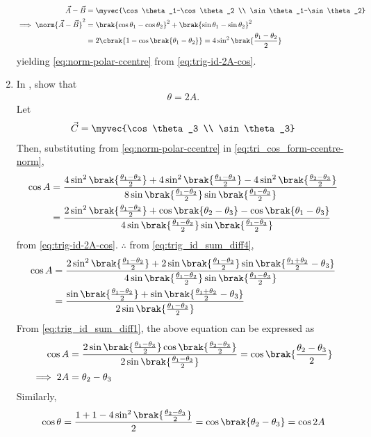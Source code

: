 \begin{enumerate}[label=\thesection.\arabic*.,ref=\thesection.\theenumi]
\begin{align}
	  \vec{A}-\vec{B} &= 
\myvec{\cos \theta_1-\cos \theta_2 \\ \sin \theta_1-\sin \theta_2}
\\
\implies 
	  \norm{\vec{A}-\vec{B}}^2 &= 
	  \brak{\cos \theta_1-\cos \theta_2}^2 +\brak{\sin \theta_1-\sin \theta_2}^2
	  \\
	  &= 2\cbrak{1-
	  \cos \brak{\theta_1-\theta_2}} = 4 \sin^2 \brak{\frac{\theta_1-\theta_2}{2}}
  \end{align}
  yielding 
\eqref{eq:norm-polar-ccentre} from
\eqref{eq:trig-id-2A-cos}.
  \item In 
	,
show that 
  \begin{align}
	  \theta = 2A
\label{eq:ang-subtend-ccentre}.
  \end{align}
  \solution Let 
  \begin{align}
	  \vec{C} = \myvec{\cos \theta_3 \\ \sin \theta_3}
  \end{align}
  Then, 
  substituting 
  from 
\eqref{eq:norm-polar-ccentre}
in 
\eqref{eq:tri_cos_form-ccentre-norm},
  \begin{align}
	  \cos A &= \frac{4 \sin^2 \brak{\frac{\theta_1-\theta_2}{2}} +4\sin^2 \brak{\frac{\theta_1-\theta_3}{2}}-4 \sin^2 \brak{\frac{\theta_2-\theta_3}{2}}}{8 \sin \brak{\frac{\theta_1-\theta_2}{2}} \sin \brak{\frac{\theta_1-\theta_3}{2}}}
	  \\
	   &= \frac{2 \sin^2 \brak{\frac{\theta_1-\theta_2}{2}} +\cos \brak{{\theta_2-\theta_3}}- \cos \brak{{\theta_1-\theta_3}}}{4 \sin \brak{\frac{\theta_1-\theta_2}{2}} \sin \brak{\frac{\theta_1-\theta_3}{2}}}
  \end{align}
  from 
\eqref{eq:trig-id-2A-cos}. $\therefore$ from 
\eqref{eq:trig_id_sum_diff4},
  \begin{align}
	   \cos A &= \frac{2 \sin^2 \brak{\frac{\theta_1-\theta_2}{2}} +2\sin \brak{\frac{\theta_1-\theta_2}{2}}\sin \brak{\frac{\theta_1+\theta_2}{2}-\theta_3}}{4 \sin \brak{\frac{\theta_1-\theta_2}{2}} \sin \brak{\frac{\theta_1-\theta_3}{2}}}
	  \\
	   &= \frac{ \sin \brak{\frac{\theta_1-\theta_2}{2}} +\sin \brak{\frac{\theta_1+\theta_2}{2}-\theta_3}}{ 2\sin\brak{\frac{\theta_1-\theta_3}{2}}}
  \end{align}
  From 
\eqref{eq:trig_id_sum_diff1}, the above equation can be expressed as
  \begin{align}
\cos A	   &= \frac{ 2\sin \brak{\frac{\theta_1-\theta_3}{2}} \cos\brak{\frac{\theta_2-\theta_3}{2}}}{ 2\sin\brak{\frac{\theta_1-\theta_3}{2}}} = \cos\brak{\frac{\theta_2-\theta_3}{2}}
\label{eq:tri_ccentre_subtend-temp}
	   \\
	   \implies 2A &= \theta_2-\theta_3
\label{eq:tri_ccentre_subtend}
  \end{align}
  Similarly, 
  \begin{align}
	  \cos \theta = \frac{1 + 1 - 4\sin^2\brak{\frac{\theta_2-\theta_3}{2}}}{2} = \cos\brak{{\theta_2-\theta_3}}= \cos 2A
  \end{align}
\end{enumerate}

